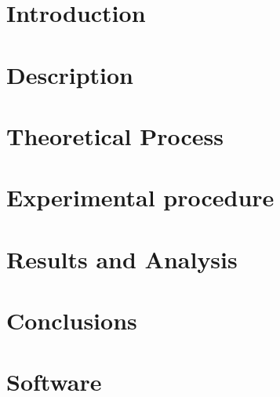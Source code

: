\documentclass[11pt]{report}
\begin{document}



\setcounter{page}{0}



\tableofcontents
\newpage\phantom{~}\newpage

\listoffigures
\newpage\phantom{~}\newpage

\listoftables
\newpage\phantom{~}\newpage

\setcounter{page}{0}    %

\chapter{Introduction}


\chapter{Description}


\chapter{Theoretical Process}


\chapter{Experimental procedure}


\chapter{Results and Analysis}


\chapter{Conclusions}




\appendix
\chapter{Software}

\end{document}
